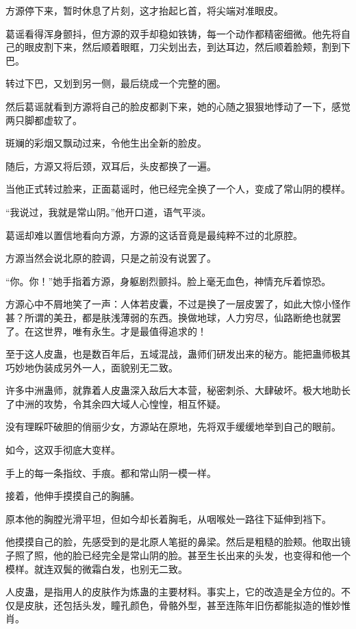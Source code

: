 \begin{this_body}
方源停下来，暂时休息了片刻，这才抬起匕首，将尖端对准眼皮。

葛谣看得浑身颤抖，但方源的双手却稳如铁铸，每一个动作都精密细微。他先将自己的眼皮割下来，然后顺着眼眶，刀尖划出去，到达耳边，然后顺着脸颊，割到下巴。

转过下巴，又划到另一侧，最后绕成一个完整的圈。

然后葛谣就看到方源将自己的脸皮都剥下来，她的心随之狠狠地悸动了一下，感觉两只脚都虚软了。

斑斓的彩烟又飘动过来，令他生出全新的脸皮。

随后，方源又将后颈，双耳后，头皮都换了一遍。

当他正式转过脸来，正面葛谣时，他已经完全换了一个人，变成了常山阴的模样。

“我说过，我就是常山阴。”他开口道，语气平淡。

葛谣却难以置信地看向方源，方源的这话音竟是最纯粹不过的北原腔。

方源当然会说北原的腔调，只是之前没有说罢了。

“你。你！”她手指着方源，身躯剧烈颤抖。脸上毫无血色，神情充斥着惊恐。

方源心中不屑地笑了一声：人体若皮囊，不过是换了一层皮罢了，如此大惊小怪作甚？所谓的美丑，都是肤浅薄弱的东西。换做地球，人力穷尽，仙路断绝也就罢了。在这世界，唯有永生。才是最值得追求的！

至于这人皮蛊，也是数百年后，五域混战，蛊师们研发出来的秘方。能把蛊师极其巧妙地伪装成另外一人，面貌别无二致。

许多中洲蛊师，就靠着人皮蛊深入敌后大本营，秘密刺杀、大肆破坏。极大地助长了中洲的攻势，令其余四大域人心惶惶，相互怀疑。

没有理睬吓破胆的俏丽少女，方源站在原地，先将双手缓缓地举到自己的眼前。

如今，这双手彻底大变样。

手上的每一条指纹、手痕。都和常山阴一模一样。

接着，他伸手摸摸自己的胸脯。

原本他的胸膛光滑平坦，但如今却长着胸毛，从咽喉处一路往下延伸到裆下。

他摸摸自己的脸，先感受到的是北原人笔挺的鼻梁。然后是粗糙的脸颊。他取出镜子照了照，他的脸已经完全是常山阴的脸。甚至生长出来的头发，也变得和他一个模样。就连双鬓的微霜白发，也别无二致。

人皮蛊，是指用人的皮肤作为炼蛊的主要材料。事实上，它的改造是全方位的。不仅是皮肤，还包括头发，瞳孔颜色，骨骼外型，甚至连陈年旧伤都能拟造的惟妙惟肖。


\end{this_body}
